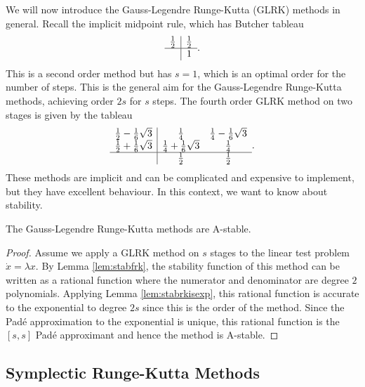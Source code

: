 We will now introduce the Gauss-Legendre Runge-Kutta (GLRK) methods in general.
Recall the implicit midpoint rule, which has Butcher tableau
\begin{equation*}
	\begin{array}{c|c}
		\frac{1}{2} & \frac{1}{2} \\
		\hline	
		& 1
	\end{array}.
\end{equation*}
This is a second order method but has $s=1$, which is an optimal order for the number of steps.
This is the general aim for the Gauss-Legendre Runge-Kutta methods, achieving order $2s$ for $s$ steps.
The fourth order GLRK method on two stages is given by the tableau
\begin{equation*}
	\begin{array}{c|cc}
		\frac{1}{2} - \frac{1}{6}\sqrt{3}  &\frac{1}{4} &\frac{1}{4} - \frac{1}{6}\sqrt{3} \\
		\frac{1}{2} + \frac{1}{6}\sqrt{3}  &\frac{1}{4} + \frac{1}{6}\sqrt{3} &\frac{1}{4} \\
		\hline
		&\frac{1}{2} &\frac{1}{2}
	\end{array}.
\end{equation*}
These methods are implicit and can be complicated and expensive to implement, but they have excellent behaviour.
In this context, we want to know about stability.

\begin{theorem}
	The Gauss-Legendre Runge-Kutta methods are A-stable.
\end{theorem}
\begin{proof}
	Assume we apply a GLRK method on $s$ stages to the linear test problem $\dot{x} = \lambda x$.
	By Lemma \ref{lem:stabfrk}, the stability function of this method can be written as a rational function where the numerator and denominator are degree $2$ polynomials.
	Applying Lemma \ref{lem:stabrkisexp}, this rational function is accurate to the exponential to degree $2s$ since this is the order of the method.
	Since the Pad\'e approximation to the exponential is unique, this rational function is the $[s,s]$ Pad\'e approximant and hence the method is A-stable.
\end{proof}

\subsection{Symplectic Runge-Kutta Methods}


